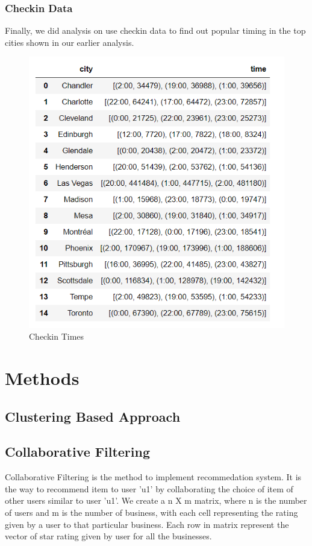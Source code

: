 \documentclass[11pt]{article}
\begin{document}
 	\subsubsection{Checkin Data}
 	Finally, we did analysis on use checkin data to find out popular timing in the top cities shown in our earlier analysis.
 
      \begin{figure}[h]
 		\centering
 		\includegraphics[scale=0.5] {checkin_times.png}
 		\caption{Checkin Times}
 	\end{figure}
 	
	\section{Methods}
		
		\subsection{Clustering Based Approach}
		
		\subsection{Collaborative Filtering}
		Collaborative Filtering is the method to implement recommedation system. It is the way to recommend item to user 'u1' by collaborating the choice of item of other users similar to user 'u1'. We create a n X m matrix, where n is the number of users and m is the number of business, with each cell representing the rating given by a user to that particular business. Each row in matrix represent the vector of star rating given by user for all the businesses. \\
	 
\end{document}
